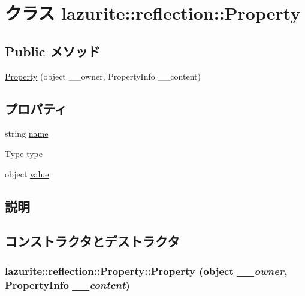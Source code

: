 \hypertarget{classlazurite_1_1reflection_1_1_property}{
\section{クラス lazurite::reflection::Property}
\label{classlazurite_1_1reflection_1_1_property}
}
\subsection*{Public メソッド}
\begin{DoxyCompactItemize}
\item 
\hyperlink{classlazurite_1_1reflection_1_1_property_a8ec06896b416e10baddb29f3c2979403}{Property} (object \_\-\_\-owner, PropertyInfo \_\-\_\-content)
\end{DoxyCompactItemize}
\subsection*{プロパティ}
\begin{DoxyCompactItemize}
\item 
string \hyperlink{classlazurite_1_1reflection_1_1_property_aecae67b838879bf8710e29bbe20c26c4}{name}
\item 
Type \hyperlink{classlazurite_1_1reflection_1_1_property_a9582a84bece926e0c44be9dd0f66a555}{type}
\item 
object \hyperlink{classlazurite_1_1reflection_1_1_property_acd06a0e4b2b495b89ee445b2e217dd5b}{value}
\end{DoxyCompactItemize}


\subsection{説明}


\subsection{コンストラクタとデストラクタ}
\hypertarget{classlazurite_1_1reflection_1_1_property_a8ec06896b416e10baddb29f3c2979403}{
\subsubsection[{Property}]{\setlength{\rightskip}{0pt plus 5cm}lazurite::reflection::Property::Property (object {\em \_\-\_\-owner}, \/  PropertyInfo {\em \_\-\_\-content})}}
\label{classlazurite_1_1reflection_1_1_property_a8ec06896b416e10baddb29f3c2979403}

